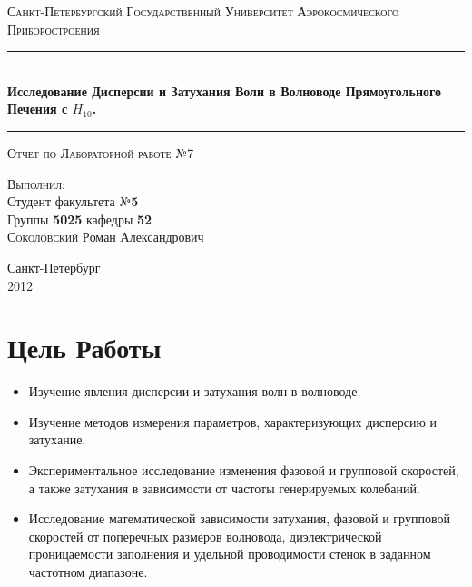 \documentclass[11pt,a4paper,oneside, reqno]{amsproc}
\author{Соколовский Роман}
\begin{document}
\begin{titlepage}
    \begin{center}
        \textsc{\large Санкт-Петербургский Государственный Университет Аэрокосмического Приборостроения}\\[5cm]
        \rule{\textwidth}{1pt}\\
        \vspace{10pt}
        { \huge \bfseries Исследование Дисперсии и Затухания
        Волн в Волноводе Прямоугольного Печения с $H_{10}$.}\\[0.4cm]
        \hrule
        \vspace{0.4cm}
        \textsc{ {\large Отчет по Лабораторной работе №7}}
        
        \vspace{2.5cm}
        \begin{flushright}
        \begin{minipage}{0.5\textwidth}
            \begin{flushright} 
                \textsc{\small Выполнил}:\\
                \large
                Студент факультета №\textbf{5}\\
                Группы \textbf{5025} кафедры \textbf{52}\\[2pt]
                \textsc{Соколовский} \textsc{Р}оман \textsc{А}лександрович
            \end{flushright}
        \end{minipage}
        \end{flushright}
        \vfill
        {\large Санкт-Петербург\\2012}
    \end{center}
\end{titlepage}

\section{Цель Работы}
\begin{itemize}
    \item Изучение явления дисперсии и затухания волн в волноводе.
    \item Изучение методов измерения параметров, характеризующих 
        дисперсию и затухание.
    \item Экспериментальное исследование изменения фазовой и групповой
        скоростей, а также затухания в зависимости от частоты
        генерируемых колебаний.
    \item Исследование математической зависимости затухания, фазовой и
        групповой скоростей от поперечных размеров волновода, 
        диэлектрической проницаемости заполнения и удельной проводимости
        стенок в заданном частотном диапазоне.\\
\end{itemize}
\end{document}
